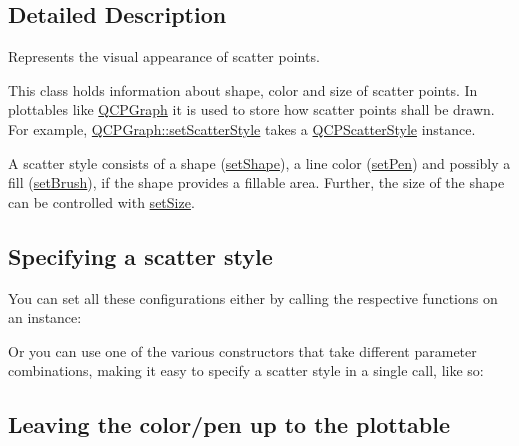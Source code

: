 \subsection{Detailed Description}
Represents the visual appearance of scatter points. 

This class holds information about shape, color and size of scatter points. In plottables like \mbox{\hyperlink{class_q_c_p_graph}{Q\+C\+P\+Graph}} it is used to store how scatter points shall be drawn. For example, \mbox{\hyperlink{class_q_c_p_graph_a12bd17a8ba21983163ec5d8f42a9fea5}{Q\+C\+P\+Graph\+::set\+Scatter\+Style}} takes a \mbox{\hyperlink{class_q_c_p_scatter_style}{Q\+C\+P\+Scatter\+Style}} instance.

A scatter style consists of a shape (\mbox{\hyperlink{class_q_c_p_scatter_style_a7c641c4d4c6d29cb705d3887cfce91c1}{set\+Shape}}), a line color (\mbox{\hyperlink{class_q_c_p_scatter_style_a761f1f229cc0ca4703e1e2b89f6dd1ba}{set\+Pen}}) and possibly a fill (\mbox{\hyperlink{class_q_c_p_scatter_style_a74d692aaeb8d4b36d6f7d510e44264b1}{set\+Brush}}), if the shape provides a fillable area. Further, the size of the shape can be controlled with \mbox{\hyperlink{class_q_c_p_scatter_style_aaefdd031052892c4136129db68596e0f}{set\+Size}}.\hypertarget{class_q_c_p_scatter_style_QCPScatterStyle-defining}{}\subsection{Specifying a scatter style}\label{class_q_c_p_scatter_style_QCPScatterStyle-defining}
You can set all these configurations either by calling the respective functions on an instance\+: 
\begin{DoxyCodeInclude}
\end{DoxyCodeInclude}
 Or you can use one of the various constructors that take different parameter combinations, making it easy to specify a scatter style in a single call, like so\+: 
\begin{DoxyCodeInclude}
\end{DoxyCodeInclude}
 \hypertarget{class_q_c_p_scatter_style_QCPScatterStyle-undefinedpen}{}\subsection{Leaving the color/pen up to the plottable}\label{class_q_c_p_scatter_style_QCPScatterStyle-undefinedpen}

